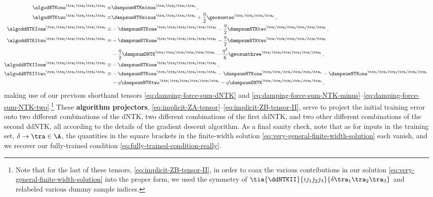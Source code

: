 \begin{align}
\algodNTKone^{\tra_1\tra_2\tra_3\tra_4}\equiv&\dampsumNTKminus^{\tra_1\tra_2\tra_3\tra_4}\, ,\label{eq:implicit-ZA-tensor} \\
\algodNTKtwo^{\tra_1\tra_2\tra_3\tra_4}\equiv&
\dampsumNTKminus^{\tra_1\tra_2\tra_3\tra_4}
+\frac{\eta}{2}\geosumtwo^{\tra_1\tra_2\tra_3\tra_4}\, ,\label{eq:implicit-ZB-tensor}\\
\algoddNTKIone^{\tra_1\tra_2\tra_3\tra_4\tra_5\tra_6}\equiv&-\dampsumNTKone^{\tra_1\tra_2\tra_3\tra_4\tra_5\tra_6} -\frac{\eta}{2} \dampsumNTKtwo^{\tra_1\tra_2\tra_3\tra_4\tra_5\tra_6}
\, ,\label{eq:implicit-ZA-tensor-I}\\
\algoddNTKItwo^{\tra_1\tra_2\tra_3\tra_4\tra_5\tra_6}\equiv&-\dampsumNTKone^{\tra_1\tra_2\tra_3\tra_4\tra_5\tra_6}- \frac{\eta}{2}\dampsumNTKtwo^{\tra_1\tra_2\tra_3\tra_4\tra_5\tra_6}\, \notag\\
&- \frac{\eta}{2}\dampsumDNTK^{\tra_1\tra_2\tra_3\tra_4\tra_5\tra_6} - \frac{\eta^2}{6}\geosumthree^{\tra_1\tra_2\tra_3\tra_4\tra_5\tra_6}
\, ,\label{eq:implicit-ZB-tensor-I}\\
\algoddNTKIIone^{\tra_1\tra_2\tra_3\tra_4\tra_5\tra_6}\equiv&-\dampsumNTKone^{\tra_1\tra_2\tra_3\tra_4\tra_5\tra_6}
\, ,\label{eq:implicit-ZA-tensor-II}\\
\algoddNTKIItwo^{\tra_1\tra_2\tra_3\tra_4\tra_5\tra_6}\equiv&-\dampsumNTKone^{\tra_1\tra_2\tra_3\tra_4\tra_5\tra_6}-\dampsumNTKone^{\tra_2\tra_1\tra_3\tra_5\tra_4\tra_6}-\dampsumNTKone^{\tra_1\tra_3\tra_2\tra_4\tra_6\tra_5}\, \notag \\
&-\eta\dampsumNTKtwo^{\tra_1\tra_2\tra_3\tra_4\tra_5\tra_6} - \eta \dampsumDNTK^{\tra_1\tra_2\tra_3\tra_4\tra_5\tra_6}
\,, \label{eq:implicit-ZB-tensor-II}
\end{align}
making use of our previous shorthand tensors \eqref{eq:damping-force-sum-dNTK} and \eqref{eq:damping-force-sum-NTK-minus}--\eqref{eq:damping-force-sum-NTK-two}.\footnote{Note that for the last of these tensors, \eqref{eq:implicit-ZB-tensor-II}, in order to coax the various contributions in our solution \eqref{eq:very-general-finite-width-solution} into the proper form, we used the symmetry of $\tia{\ddNTKII}{i j_1j_2j_3}{\delta\tra_1\tra_2\tra_3}$ and relabeled various dummy sample indices.}
These \textbf{algorithm projectors}, \eqref{eq:implicit-ZA-tensor}--\eqref{eq:implicit-ZB-tensor-II}, serve to project the initial training error onto two different combinations of the dNTK, two different combinations of the first ddNTK, and two other different combinations of the second ddNTK, all according to the details of the gradient descent algorithm. As a final sanity check, note that as for inputs in the training set, $\delta \to \tra \in \A$, the quantities in the square brackets in the finite-width solution  \eqref{eq:very-general-finite-width-solution} each vanish, and we recover our fully-trained condition \eqref{eq:fully-trained-condition-really}.




